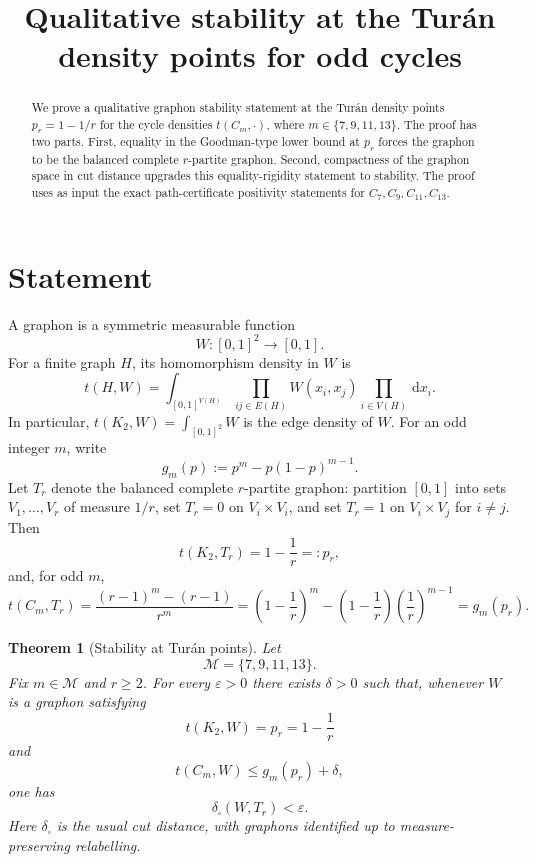 \documentclass[11pt]{article}
\title{Qualitative stability at the Tur\'an density points for odd cycles}
\author{}
\date{}
\newtheorem{theorem}{Theorem}
\newcommand{\dd}{\,\mathrm d}
\newcommand{\cutdist}{\delta_{\square}}
\newcommand{\M}{\mathcal M}
\begin{document}
\maketitle

\begin{abstract}
We prove a qualitative graphon stability statement at the Tur\'an density points
\(p_r=1-1/r\) for the cycle densities \(t(C_m,\cdot)\), where
\(m\in\{7,9,11,13\}\).  The proof has two parts.  First, equality in the
Goodman-type lower bound at \(p_r\) forces the graphon to be the balanced
complete \(r\)-partite graphon.  Second, compactness of the graphon space in cut
distance upgrades this equality-rigidity statement to stability.  The proof uses
as input the exact path-certificate positivity statements for
\(C_7,C_9,C_{11},C_{13}\).
\end{abstract}

\section{Statement}

A graphon is a symmetric measurable function
\[
        W:[0,1]^2\to[0,1].
\]
For a finite graph \(H\), its homomorphism density in \(W\) is
\[
        t(H,W)
        = \int_{[0,1]^{V(H)}} \prod_{ij\in E(H)} W(x_i,x_j)
          \prod_{i\in V(H)} \dd x_i .
\]
In particular, \(t(K_2,W)=\int_{[0,1]^2}W\) is the edge density of \(W\).
For an odd integer \(m\), write
\[
        g_m(p):=p^m-p(1-p)^{m-1}.
\]
Let \(T_r\) denote the balanced complete \(r\)-partite graphon: partition
\([0,1]\) into sets \(V_1,\ldots,V_r\) of measure \(1/r\), set
\(T_r=0\) on \(V_i\times V_i\), and set \(T_r=1\) on
\(V_i\times V_j\) for \(i\ne j\).  Then
\[
        t(K_2,T_r)=1-\frac1r=:p_r,
\]
and, for odd \(m\),
\[
        t(C_m,T_r)
        = \frac{(r-1)^m-(r-1)}{r^m}
        = \left(1-\frac1r\right)^m
          -\left(1-\frac1r\right)\left(\frac1r\right)^{m-1}
        = g_m(p_r).
\]

\begin{theorem}[Stability at Tur\'an points]
\label{thm:main-stability}
Let
\[
        \M=\{7,9,11,13\}.
\]
Fix \(m\in\M\) and \(r\ge 2\).  For every \(\varepsilon>0\) there exists
\(\delta>0\) such that, whenever \(W\) is a graphon satisfying
\[
        t(K_2,W)=p_r=1-\frac1r
\]
and
\[
        t(C_m,W)\le g_m(p_r)+\delta,
\]
one has
\[
        \cutdist(W,T_r)<\varepsilon.
\]
Here \(\cutdist\) is the usual cut distance, with graphons identified up to
measure-preserving relabelling.
\end{theorem}
\end{document}
